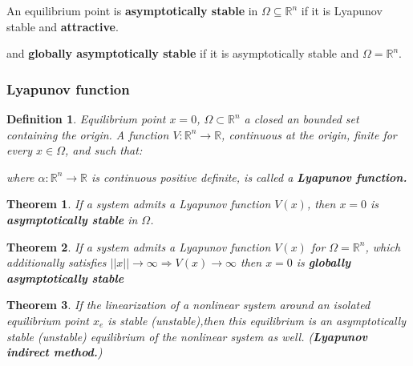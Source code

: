 \documentclass[8pt,a4paper]{scrartcl}
\newtheorem{define}{Definition}
\newtheorem{theorem}{Theorem}
\begin{document}
\begin{multicols*}{3}
\begin{multicols*}{4}

An equilibrium point is \textbf{asymptotically stable} in $\Omega\subseteq\mathbb{R}^n$ if it is Lyapunov stable and \textbf{attractive}.


and \textbf{globally asymptotically stable} if it is asymptotically stable and $\Omega=\mathbb{R}^n$.

\subsubsection{Lyapunov function}

\begin{define}
Equilibrium point $x=0$, $\Omega\subset\mathbb{R}^n$ a closed an bounded set containing the origin. A function $V:\mathbb{R}^n\rightarrow\mathbb{R}$, continuous at the origin, finite for every $x\in\Omega$, and such that:


where $\alpha:\mathbb{R}^n\rightarrow\mathbb{R}$ is continuous positive definite, is called a \textbf{Lyapunov function.}
\end{define}

\begin{theorem}If a system admits a Lyapunov function $V(x)$, then $x=0$ is \textbf{asymptotically stable} in $\Omega$.
\end{theorem}

\begin{theorem}If a system admits a Lyapunov function $V(x)$ for $\Omega=\mathbb{R}^n$, which additionally satisfies $||x||\rightarrow\infty\Rightarrow V(x)\rightarrow\infty$ then $x=0$ is \textbf{globally asymptotically stable}
\end{theorem}

\begin{theorem} If the linearization of a nonlinear system around an isolated equilibrium point $x_e$ is stable (unstable),then this equilibrium is an asymptotically stable (unstable) equilibrium of the nonlinear system as well. (\textbf{Lyapunov indirect method.})
\end{theorem}


\end{multicols*}
\end{multicols*}
\end{document}

